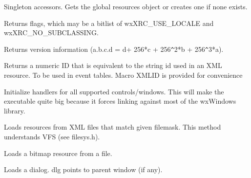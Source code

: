 Singleton accessors.
Gets the global resources object or creates one if none exists.


\label{wxxmlresourcegetflags}


Returns flags, which may be a bitlist of wxXRC\_USE\_LOCALE and wxXRC\_NO\_SUBCLASSING.


\label{wxxmlresourcegetversion}


Returns version information (a.b.c.d = d+ 256*c + 256\verb|^|2*b + 256\verb|^|3*a).


\label{wxxmlresourcegetxmlid}


Returns a numeric ID that is equivalent to the string id used in an XML
resource. To be used in event tables.
Macro XMLID is provided for convenience


\label{wxxmlresourceinitallhandlers}


Initialize handlers for all supported controls/windows. This will
make the executable quite big because it forces linking against
most of the wxWindows library.


\label{wxxmlresourceload}


Loads resources from XML files that match given filemask.
This method understands VFS (see filesys.h).


\label{wxxmlresourceloadbitmap}


Loads a bitmap resource from a file.


\label{wxxmlresourceloaddialog}


Loads a dialog. dlg points to parent window (if any).



